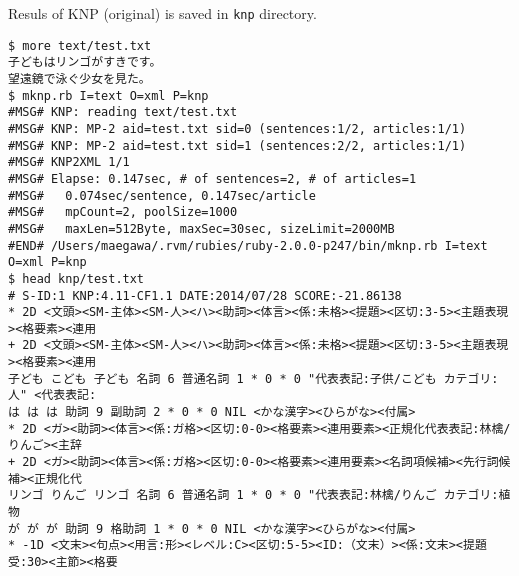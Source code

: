 Resuls of KNP (original) is saved in \verb|knp| directory. 


\begin{Verbatim}[baselinestretch=0.7,frame=single]
$ more text/test.txt
子どもはリンゴがすきです。
望遠鏡で泳ぐ少女を見た。
$ mknp.rb I=text O=xml P=knp
#MSG# KNP: reading text/test.txt
#MSG# KNP: MP-2 aid=test.txt sid=0 (sentences:1/2, articles:1/1)
#MSG# KNP: MP-2 aid=test.txt sid=1 (sentences:2/2, articles:1/1)
#MSG# KNP2XML 1/1
#MSG# Elapse: 0.147sec, # of sentences=2, # of articles=1
#MSG#   0.074sec/sentence, 0.147sec/article
#MSG#   mpCount=2, poolSize=1000
#MSG#   maxLen=512Byte, maxSec=30sec, sizeLimit=2000MB
#END# /Users/maegawa/.rvm/rubies/ruby-2.0.0-p247/bin/mknp.rb I=text O=xml P=knp
$ head knp/test.txt
# S-ID:1 KNP:4.11-CF1.1 DATE:2014/07/28 SCORE:-21.86138
* 2D <文頭><SM-主体><SM-人><ハ><助詞><体言><係:未格><提題><区切:3-5><主題表現><格要素><連用
+ 2D <文頭><SM-主体><SM-人><ハ><助詞><体言><係:未格><提題><区切:3-5><主題表現><格要素><連用
子ども こども 子ども 名詞 6 普通名詞 1 * 0 * 0 "代表表記:子供/こども カテゴリ:人" <代表表記:
は は は 助詞 9 副助詞 2 * 0 * 0 NIL <かな漢字><ひらがな><付属>
* 2D <ガ><助詞><体言><係:ガ格><区切:0-0><格要素><連用要素><正規化代表表記:林檎/りんご><主辞
+ 2D <ガ><助詞><体言><係:ガ格><区切:0-0><格要素><連用要素><名詞項候補><先行詞候補><正規化代
リンゴ りんご リンゴ 名詞 6 普通名詞 1 * 0 * 0 "代表表記:林檎/りんご カテゴリ:植物
が が が 助詞 9 格助詞 1 * 0 * 0 NIL <かな漢字><ひらがな><付属>
* -1D <文末><句点><用言:形><レベル:C><区切:5-5><ID:（文末）><係:文末><提題受:30><主節><格要
\end{Verbatim}
